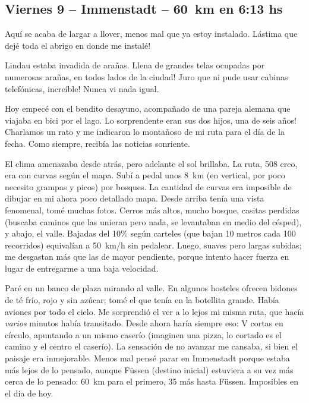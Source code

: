 \subsection*{Viernes 9 -- Immenstadt -- 60~km en 6:13 hs}

Aqu\'i se acaba de largar a llover, menos mal que ya estoy instalado.
\textexclamdown L\'astima que dej\'e toda el abrigo en donde me instal\'e!

Lindau estaba invadida de ara\~nas. \textexclamdown Llena de grandes telas
ocupadas por numerosas ara\~nas, en todos lados de la ciudad! Juro que ni pude
usar cabinas telef\'onicas, \textexclamdown incre\'ible! Nunca vi nada igual.

Hoy empec\'e con el bendito desayuno, acompa\~nado de una pareja alemana que
viajaba en bici por el lago. Lo sorprendente eran sus dos hijos, \textexclamdown
una de seis a\~nos! Charlamos un rato y me indicaron lo monta\~noso de mi ruta
para el d\'ia de la fecha. Como siempre, recib\'ia las noticias sonriente.

El clima amenazaba desde atr\'as, pero adelante el sol brillaba. La ruta, 508
creo, era con curvas seg\'un el mapa. Sub\'i a pedal unos 8~km (en vertical,
por poco necesito grampas y picos) por bosques. La cantidad de
curvas era imposible de dibujar en mi ahora poco detallado mapa. Desde arriba
ten\'ia una vista fenomenal, tom\'e muchas fotos. Cerros m\'as altos, mucho
bosque, casitas perdidas (buscaba caminos que las unieran pero nada, se
levantaban en medio del c\'esped), y abajo, el valle. Bajadas del 10\% seg\'un
carteles (que bajan 10 metros cada 100 recorridos) equival\'ian a 50~km/h sin
pedalear. Luego, suaves pero largas subidas; me desgastan m\'as que las de
mayor pendiente, porque intento hacer fuerza en lugar de entregarme a una baja
velocidad.

Par\'e en un banco de plaza mirando al valle. En algunos hosteles ofrecen
bidones de t\'e fr\'io, rojo y sin az\'ucar; tom\'e el que ten\'ia en la
botellita grande. Hab\'ia aviones por todo el cielo. Me sorprendi\'o el ver a
lo lejos mi misma ruta, que hac\'ia \emph{varios} minutos hab\'ia transitado.
Desde ahora har\'ia siempre eso: {\small V} cortas en c\'irculo, apuntando a
un mismo caser\'io (imaginen una pizza, lo cortado es el camino y el centro el
caser\'io). La sensaci\'on de no avanzar me cansaba, si bien el paisaje era
inmejorable. Menos mal pens\'e parar en Immenstadt porque estaba m\'as lejos
de lo pensado, aunque F\"ussen (destino inicial) estuviera a su vez m\'as
cerca de lo pensado: 60~km para el primero, 35 m\'as hasta F\"ussen. Imposibles
en el d\'ia de hoy.

